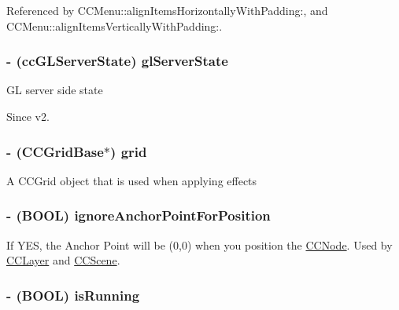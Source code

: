Referenced by C\-C\-Menu\-::align\-Items\-Horizontally\-With\-Padding\-:, and C\-C\-Menu\-::align\-Items\-Vertically\-With\-Padding\-:.

\hypertarget{class_c_c_node_ad0146f65e6d5edeee5bf80466d4cd738}{
\subsubsection[{gl\-Server\-State}]{\setlength{\rightskip}{0pt plus 5cm}-\/ ({\bf cc\-G\-L\-Server\-State}) {\bf gl\-Server\-State}}}\label{class_c_c_node_ad0146f65e6d5edeee5bf80466d4cd738}
G\-L server side state \begin{DoxySince}{Since}
v2. 
\end{DoxySince}
\hypertarget{class_c_c_node_ae7c8dade03d8bcd244766b97d21ef80f}{
\subsubsection[{grid}]{\setlength{\rightskip}{0pt plus 5cm}-\/ ({\bf C\-C\-Grid\-Base}$\ast$) {\bf grid}}}\label{class_c_c_node_ae7c8dade03d8bcd244766b97d21ef80f}
A C\-C\-Grid object that is used when applying effects \hypertarget{class_c_c_node_a1798f20ed00ae4514ab7f2fc9ffe7e2b}{
\subsubsection[{ignore\-Anchor\-Point\-For\-Position}]{\setlength{\rightskip}{0pt plus 5cm}-\/ (B\-O\-O\-L) {\bf ignore\-Anchor\-Point\-For\-Position}}}\label{class_c_c_node_a1798f20ed00ae4514ab7f2fc9ffe7e2b}
If Y\-E\-S, the Anchor Point will be (0,0) when you position the \hyperlink{class_c_c_node}{C\-C\-Node}. Used by \hyperlink{class_c_c_layer}{C\-C\-Layer} and \hyperlink{interface_c_c_scene}{C\-C\-Scene}. \hypertarget{class_c_c_node_a0ef88eaa1917c87173866f76dac006b3}{
\subsubsection[{is\-Running}]{\setlength{\rightskip}{0pt plus 5cm}-\/ (B\-O\-O\-L) {\bf is\-Running}}}\label{class_c_c_node_a0ef88eaa1917c87173866f76dac006b3}
